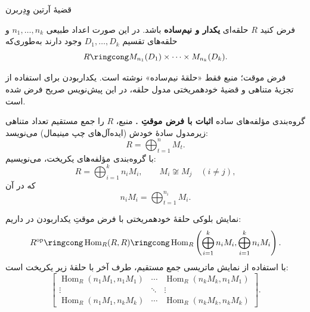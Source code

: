 \begin{frame}[t]{قضیهٔ آرتین وِدِربرن}
    \label{lec12:artin-wedderburn}
    \begin{theorem}
        فرض کنید $R$ حلقه‌ای \textbf{یکدار و نیم‌ساده} باشد. در این صورت اعداد طبیعی
        $n_1,\ldots,n_k$ و حلقه‌های تقسیم $D_1,\ldots,D_k$ وجود دارند به‌طوری‌که
        \[
            R\ringcong M_{n_1}(D_1)\times\cdots\times M_{n_k}(D_k).
        \]
    \end{theorem}
    \begin{alertblock}{فرض موقت؛ }
        منبع فقط «حلقهٔ نیم‌ساده» نوشته است. یکداربودن برای استفاده از
        تجزیهٔ متناهی و قضیهٔ خودهمریختی مدول حلقه، در این پیش‌نویس صریح فرض شده است.
    \end{alertblock}
\end{frame}

\begin{frame}[t]{گروه‌بندی مؤلفه‌های ساده}
    \label{lec12:simple-grouping}
    \textbf{اثبات با فرض موقتِ .}
    منبع، $R$ را جمع مستقیم تعداد متناهی زیرمدول سادهٔ خودش
    (ایده‌آل‌های چپ مینیمال) می‌نویسد:
    \[
        R=\bigoplus_{t=1}^{n}M_t.
    \]
    با گروه‌بندی مؤلفه‌های یکریخت، می‌نویسیم:
    \[
        R=\bigoplus_{i=1}^{k}n_iM_i,
        \qquad M_i\not\cong M_j\quad(i\ne j),
    \]
    که در آن
    \[
        n_iM_i=\bigoplus_{t=1}^{n_i}M_i.
    \]
\end{frame}

\begin{frame}[t]{نمایش بلوکی حلقهٔ خودهمریختی}
    \label{lec12:block-endomorphisms}
    با فرض موقتِ یکداربودن در  داریم:
    \[
        R^{\mathrm{op}}\ringcong\operatorname{Hom}_R(R,R)
        \ringcong\operatorname{Hom}_R\left(
        \bigoplus_{i=1}^{k}n_iM_i,\bigoplus_{i=1}^{k}n_iM_i\right).
    \]
    با استفاده از نمایش ماتریسی جمع مستقیم، طرف آخر با حلقهٔ زیر یکریخت است:
    \[
        \begin{bmatrix}
        \operatorname{Hom}_R(n_1M_1,n_1M_1)&\cdots&\operatorname{Hom}_R(n_kM_k,n_1M_1)\\
        \vdots&\ddots&\vdots\\
        \operatorname{Hom}_R(n_1M_1,n_kM_k)&\cdots&\operatorname{Hom}_R(n_kM_k,n_kM_k)
        \end{bmatrix}.
    \]
\end{frame}

